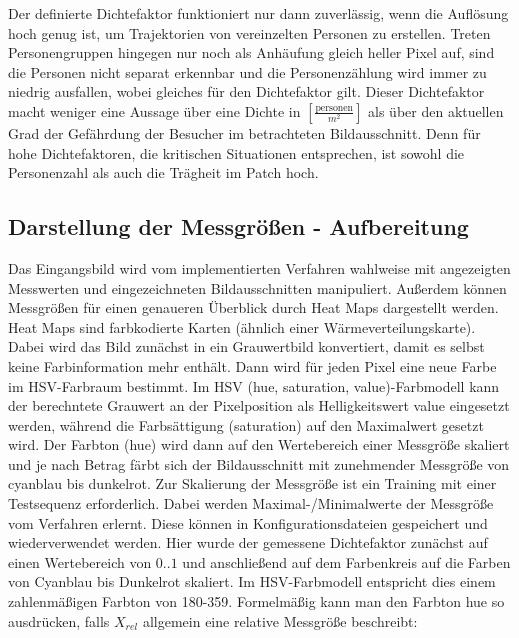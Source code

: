 Der definierte Dichtefaktor funktioniert nur dann zuverlässig, wenn die Auflösung hoch genug ist, um Trajektorien von vereinzelten Personen zu erstellen. Treten Personengruppen hingegen nur noch als Anhäufung gleich heller Pixel auf, sind die Personen nicht separat erkennbar und die Personenzählung wird immer zu niedrig ausfallen, wobei gleiches für den Dichtefaktor gilt. Dieser Dichtefaktor macht weniger eine Aussage über eine Dichte in $[\frac{\text{personen}}{m^2}]$ als über den aktuellen Grad der Gefährdung der Besucher im betrachteten Bildausschnitt. Denn für hohe Dichtefaktoren, die kritischen Situationen entsprechen, ist sowohl die Personenzahl als auch die Trägheit im Patch hoch.

\subsection{Darstellung der Messgrößen - Aufbereitung}
Das Eingangsbild wird vom implementierten Verfahren wahlweise mit angezeigten Messwerten und eingezeichneten Bildausschnitten manipuliert. Außerdem können Messgrößen für einen genaueren Überblick durch Heat Maps dargestellt werden. Heat Maps sind farbkodierte Karten (ähnlich einer Wärmeverteilungskarte). Dabei wird das Bild zunächst in ein Grauwertbild konvertiert, damit es selbst keine Farbinformation mehr enthält. Dann wird für jeden Pixel eine neue Farbe im HSV-Farbraum bestimmt. Im HSV (hue, saturation, value)-Farbmodell kann der berechntete Grauwert an der Pixelposition als Helligkeitswert value eingesetzt werden, während die Farbsättigung (saturation) auf den Maximalwert gesetzt wird. Der Farbton (hue) wird dann auf den Wertebereich einer Messgröße skaliert und je nach Betrag färbt sich der Bildausschnitt mit zunehmender Messgröße von cyanblau bis dunkelrot. Zur Skalierung der Messgröße ist ein Training mit einer Testsequenz erforderlich. Dabei werden Maximal-/Minimalwerte der Messgröße vom Verfahren erlernt.
\newpage
Diese können in Konfigurationsdateien gespeichert und wiederverwendet werden. Hier wurde der gemessene Dichtefaktor zunächst auf einen Wertebereich von ${0..1}$ und anschließend auf dem Farbenkreis auf die Farben von Cyanblau bis Dunkelrot skaliert. Im HSV-Farbmodell entspricht dies einem zahlenmäßigen Farbton von 180-359. Formelmäßig kann man den Farbton hue so ausdrücken, falls $X_{rel}$ allgemein eine relative Messgröße beschreibt: 


